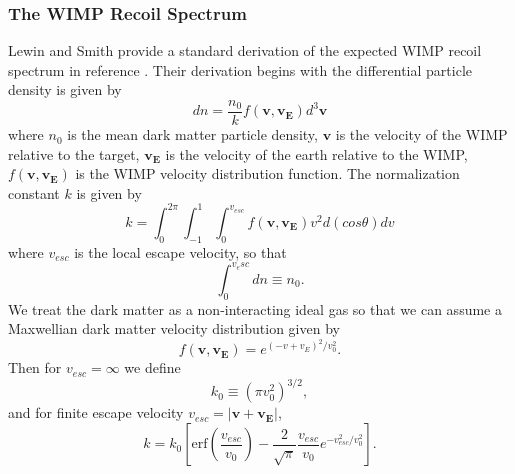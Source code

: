 \documentclass[a4paper,12pt]{article}
\begin{document}
\subsubsection{The WIMP Recoil Spectrum}

Lewin and Smith provide a standard derivation of the expected WIMP recoil spectrum in reference \cite{Lewin}.  Their derivation begins with the differential particle density is given by 
\begin{equation}
dn=\frac{n_0}{k} f(\mathbf{v},\mathbf{v_E}) d^3\mathbf{v}
\end{equation}
where $n_0$ is the mean dark matter particle density, $\mathbf{v}$ is the velocity of the WIMP relative to the target, $\mathbf{v_E}$ is the velocity of the earth relative to the WIMP, $f(\mathbf{v},\mathbf{v_E})$ is the WIMP velocity distribution function.  The normalization constant $k$ is given by
\begin{equation}
k=\int_0^{2\pi}\int_{-1}^{1} \int_0^{v_{esc}}  f(\mathbf{v},\mathbf{v_E}) v^2 d(cos\theta)dv
\end{equation}
where $v_{esc}$ is the local escape velocity, so that 
\begin{equation}
\int_0^{v_esc}dn \equiv n_0.
\end{equation}
We treat the dark matter as a non-interacting ideal gas so that we can assume a Maxwellian dark matter velocity distribution given by
\begin{equation}
f(\mathbf{v},\mathbf{v_E})=e^{(-v+v_{E})^2/v_0^2}.
\end{equation}
Then for $v_{esc}=\infty$ we define
\begin{equation} \label{k-not}
k_0 \equiv (\pi v_0^2)^{3/2},
\end{equation}
and for finite escape velocity $v_{esc}=|\mathbf{v}+\mathbf{v_E}|$,
\begin{equation}
k=k_0[\mbox{erf}(\frac{v_{esc}}{v_0}) - \frac{2}{\sqrt{\pi}} \frac{v_{esc}}{v_0} e^{-v_{esc}^2/v_0^2}].
\end{equation}
\end{document}

